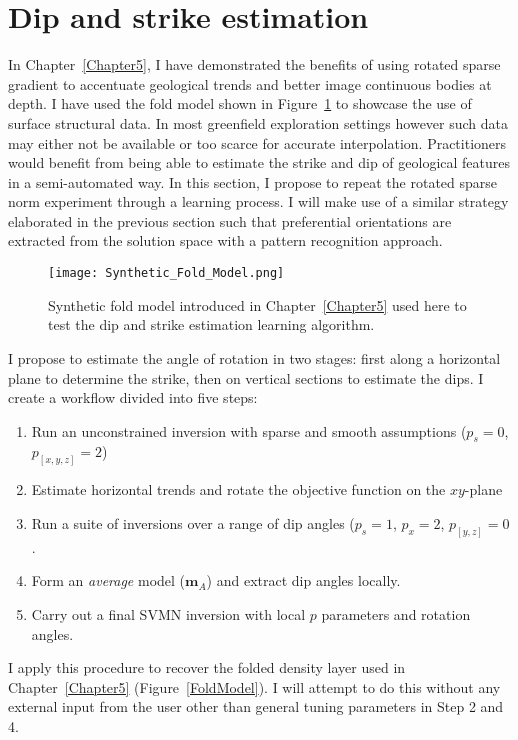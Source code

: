 \section{Dip and strike estimation}
In Chapter~\ref{Chapter5}, I have demonstrated the benefits of using rotated sparse gradient to accentuate geological trends and better image continuous bodies at depth. I have used the fold model shown in Figure~\ref{FoldModel_DipStrikeEst} to showcase the use of surface structural data. In most greenfield exploration settings however such data may either not be available or too scarce for accurate interpolation. Practitioners would benefit from being able to estimate the strike and dip of geological features in a semi-automated way.
In this section, I propose to repeat the rotated sparse norm experiment through a learning process. I will make use of a similar strategy elaborated in the previous section such that preferential orientations are extracted from the solution space with a pattern recognition approach.

\begin{figure}\centering
\texttt{[image: Synthetic\_Fold\_Model.png]}
\caption{Synthetic fold model introduced in Chapter~\ref{Chapter5} used here to test the dip and strike estimation learning algorithm.}
\label{FoldModel_DipStrikeEst}
\end{figure}


I propose to estimate the angle of rotation in two stages: first along a horizontal plane to determine the strike, then on vertical sections to estimate the dips. I create a workflow divided into five steps:
\begin{enumerate}
\item Run an unconstrained inversion with sparse and smooth assumptions ($p_s=0$, $p_{[x,y,z]}=2$)
\item Estimate horizontal trends and rotate the objective function on the $xy$-plane
\item Run a suite of inversions over a range of dip angles ($p_s=1$, $p_x=2$, $p_{[y,z]}=0$.
\item Form an \emph{average} model ($\mathbf{m}_A$) and extract dip angles locally.
\item Carry out a final SVMN inversion with local $p$ parameters and rotation angles.
\end{enumerate}
I apply this procedure to recover the folded density layer used in Chapter~\ref{Chapter5} (Figure~\ref{FoldModel}).
I will attempt to do this without any external input from the user other than general tuning parameters in Step 2 and 4.

